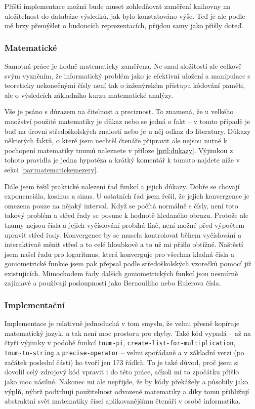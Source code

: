 Příští implementace možná bude muset zohledňovat zaměření knihovny na uložitelnost do databáze výsledků, jak bylo konstatováno výše. Teď je ale podle mě brzy přemýšlet o budoucích reprezentacích, přijdou samy jako přišly doteď.

\subsubsection{Matematické}
Samotná práce je hodně matematicky zaměřena. Ne snad složitostí ale celkově svým vyzněním, že informatický problém jako je efektivní uložení a manipulace s teoreticky nekonečnými čísly není tak o inženýrském přístupu kódování paměti, ale o výsledcích základního kurzu matematické analýzy.

Vše je psáno s důrazem na čitelnost a preciznost. To znamená, že u velkého množství použité matematiky je důkaz nebo se jedná o fakt -- v tomto případě je buď na úrovni středoškolských znalostí nebo je u něj odkaz do literatury. Důkazy některých faktů, o které jsem nechtěl čtenáře připravit ale nejsou nutné k pochopení matematiky tnumů naleznete v příloze \ref{pril:dukazy}. Výjimkou z tohoto pravidla je jedna hypotéza a krátký komentář k tomuto najdete níže v sekci \ref{par:matematickemezery}.

Dále jsem řešil praktické nalezení řad funkcí a jejich důkazy. Dobře se chovají exponenciála, kosinus a sinus. U ostatních řad jsem řešil, že jejich konvergence je omezena pouze na nějaký interval. Když se počítá normálně s čísly, není toto takový problém a střed řady se posune k hodnotě hledaného obrazu. Protože ale tnumy nejsou čísla a jejich vyčíslování probíhá líně, není možné před výpočtem upravit střed řady. Konvergence by se musela kontrolovat během vyčíslování a interaktivně měnit střed a to celé hloubkově a to už mi přišlo obtížné. Naštěstí jsem našel řadu pro logaritmus, která konverguje pro všechna kladná čísla a goniometrické funkce jsem pak přepsal podle středoškolských vzorečků pomocí již existujících. Mimochodem řady dalších goniometrických funkcí jsou nesmírně zajímavé a používají posloupnosti jako Bernoulliho nebo Eulerova čísla.

\subsubsection{Implementační}
Implementace je relativně jednoduchá v tom smyslu, že velmi přesně kopíruje matematický jazyk, a tak není moc prostoru pro chyby. Také kód vypadá -- až na čtyři výjimky v podobě funkcí \texttt{tnum-pi}, \texttt{create-list-for-multiplication}, \texttt{tnum-to-string} a \texttt{precise-operator} -- velmi spořádaně a v základní verzi (po začátek poslední části) ho tvoří jen 173 řádků. To je také důvod, proč jsem si dovolil celý zdrojový kód vpravit i do této práce, ačkoli mi to zpočátku přišlo jako moc násilné. Nakonec mi ale nepřijde, že by kódy překážely a působily jako výplň, nýbrž podtrhují použitelnost odvozené matematiky a díky tomu přibližují abstraktní svět matematiky čísel aplikovanějšímu čtenáři v osobě informatika.

